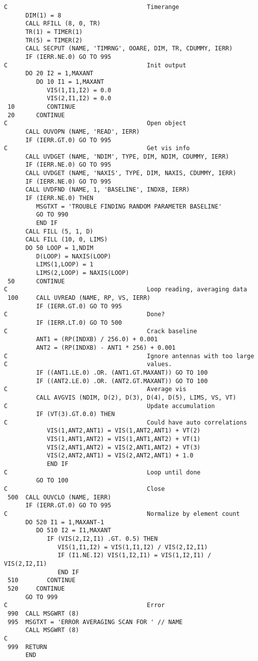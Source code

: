 {\begin{verbatim}
C                                       Timerange
      DIM(1) = 8
      CALL RFILL (8, 0, TR)
      TR(1) = TIMER(1)
      TR(5) = TIMER(2)
      CALL SECPUT (NAME, 'TIMRNG', OOARE, DIM, TR, CDUMMY, IERR)
      IF (IERR.NE.0) GO TO 995
C                                       Init output
      DO 20 I2 = 1,MAXANT
         DO 10 I1 = 1,MAXANT
            VIS(1,I1,I2) = 0.0
            VIS(2,I1,I2) = 0.0
 10         CONTINUE
 20      CONTINUE
C                                       Open object
      CALL OUVOPN (NAME, 'READ', IERR)
      IF (IERR.GT.0) GO TO 995
C                                       Get vis info
      CALL UVDGET (NAME, 'NDIM', TYPE, DIM, NDIM, CDUMMY, IERR)
      IF (IERR.NE.0) GO TO 995
      CALL UVDGET (NAME, 'NAXIS', TYPE, DIM, NAXIS, CDUMMY, IERR)
      IF (IERR.NE.0) GO TO 995
      CALL UVDFND (NAME, 1, 'BASELINE', INDXB, IERR)
      IF (IERR.NE.0) THEN
         MSGTXT = 'TROUBLE FINDING RANDOM PARAMETER BASELINE'
         GO TO 990
         END IF
      CALL FILL (5, 1, D)
      CALL FILL (10, 0, LIMS)
      DO 50 LOOP = 1,NDIM
         D(LOOP) = NAXIS(LOOP)
         LIMS(1,LOOP) = 1
         LIMS(2,LOOP) = NAXIS(LOOP)
 50      CONTINUE
C                                       Loop reading, averaging data
 100     CALL UVREAD (NAME, RP, VS, IERR)
         IF (IERR.GT.0) GO TO 995
C                                       Done?
         IF (IERR.LT.0) GO TO 500
C                                       Crack baseline
         ANT1 = (RP(INDXB) / 256.0) + 0.001
         ANT2 = (RP(INDXB) - ANT1 * 256) + 0.001
C                                       Ignore antennas with too large
C                                       values.
         IF ((ANT1.LE.0) .OR. (ANT1.GT.MAXANT)) GO TO 100
         IF ((ANT2.LE.0) .OR. (ANT2.GT.MAXANT)) GO TO 100
C                                       Average vis
         CALL AVGVIS (NDIM, D(2), D(3), D(4), D(5), LIMS, VS, VT)
C                                       Update accumulation
         IF (VT(3).GT.0.0) THEN
C                                       Could have auto correlations
            VIS(1,ANT2,ANT1) = VIS(1,ANT2,ANT1) + VT(2)
            VIS(1,ANT1,ANT2) = VIS(1,ANT1,ANT2) + VT(1)
            VIS(2,ANT1,ANT2) = VIS(2,ANT1,ANT2) + VT(3)
            VIS(2,ANT2,ANT1) = VIS(2,ANT2,ANT1) + 1.0
            END IF
C                                       Loop until done
         GO TO 100
C                                       Close
 500  CALL OUVCLO (NAME, IERR)
      IF (IERR.GT.0) GO TO 995
C                                       Normalize by element count
      DO 520 I1 = 1,MAXANT-1
         DO 510 I2 = I1,MAXANT
            IF (VIS(2,I2,I1) .GT. 0.5) THEN
               VIS(1,I1,I2) = VIS(1,I1,I2) / VIS(2,I2,I1)
               IF (I1.NE.I2) VIS(1,I2,I1) = VIS(1,I2,I1) / VIS(2,I2,I1)
               END IF
 510        CONTINUE
 520     CONTINUE
      GO TO 999
C                                       Error
 990  CALL MSGWRT (8)
 995  MSGTXT = 'ERROR AVERAGING SCAN FOR ' // NAME
      CALL MSGWRT (8)
C
 999  RETURN
      END
\end{verbatim}}

